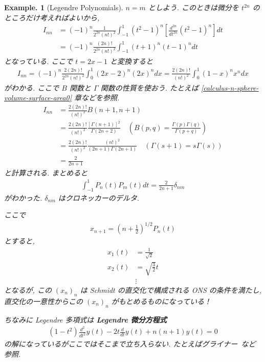 \documentclass[openany, a4paper, oneside]{jsbook}
\theoremstyle{break}
\theoremstyle{breakdefn}
\newtheorem{ex}[thm]{Example.}
\newcommand{\rbk}[1]{\left (#1\right)}
\newcommand{\sqbk}[1]{\left[#1\right]}
\begin{document}
\begin{ex}[Legendre Polynomials]
$n=m$ としよう.
このときは微分を $t^{2n}$ のところだけ考えればよいから,
\begin{align}
 I_{nn}
 &=
 (-1)^n\frac{1}{2^{2n} (n!)^2} \int_{-1}^1
  \rbk{t^2 - 1}^n
  \sqbk{\frac{d^{2n}}{dt^{2n}} \rbk{t^2 - 1}^n}dt \\
  &=
  (-1)^n \frac{(2n)!}{2^{2n} (n!)^2} \int_{-1}^1
   (t+1)^n(t -1)^n dt
\end{align}
となっている.
ここで $t = 2x -1$ と変換すると
\begin{align}
 I_{nn}
 =
 (-1)^n \frac{2(2n)!}{2^{2n} (n!)^2} \int_0^1
  (2x -2)^n (2x)^n dx
 =
 \frac{2(2n)!}{(n!)^2} \int_0^1
  (1-x)^n x^n dx
\end{align}
がわかる.
ここで $B$ 関数と $\Gamma$ 関数の性質を使おう.
たとえば \ref{calculus-n-sphere-volume-surface-area0} 章などを参照.
\begin{align}
 I_{nn}
 &=
 \frac{2(2n)!}{(n!)^2} B(n+1, n+1) \\
 &=
 \frac{2(2n)!}{(n!)^2} \frac{\sqbk{\Gamma(n+1)}^2}{\Gamma(2n+2)}
 \quad \rbk{B(p, q) = \frac{\Gamma(p) \Gamma(q)}{\Gamma(p+q)}} \\
 &=
 \frac{2(2n)!}{(n!)^2} \frac{(n!)^2}{(2n+1) \Gamma(2n+1)}
 \quad \rbk{\Gamma(s+1) = s \Gamma(s)} \\
 &=
 \frac{2}{2n + 1}
\end{align}
と計算される.
まとめると
\begin{align}
 \int_{-1}^1 P_n(t) P_m(t) dt
 =
 \frac{2}{2n + 1} \delta_{nm}
\end{align}
がわかった.
$\delta_{nm}$ はクロネッカーのデルタ.

ここで
\begin{align}
 x_{n+1}
 =
 \rbk{n+\frac{1}{2}}^{1/2} P_n(t)
\end{align}
とすると,
\begin{align}
 x_1(t)
 &=
 \frac{1}{\sqrt{2}} \\
 x_2(t)
 &=
 \sqrt{\frac{3}{2}} t \\
 &\vdots
\end{align}
となるが, この $(x_n)_n$ は Schmidt の直交化で構成される ONS の条件を満たし,
直交化の一意性からこの $(x_n)_n$ がもとめるものになっている！

ちなみに Legendre 多項式は \textbf{Legendre 微分方程式}
\begin{align}
 \rbk{1 - t^2} \frac{d^2}{dt^2} y(t) - 2t \frac{d}{dt} y(t) + n(n+1) y(t)
 =
 0
\end{align}
の解になっているがここではそこまで立ち入らない.
たとえばグライナー~\cite{WalterGreiner1}など参照.
\end{ex}
\end{document}
